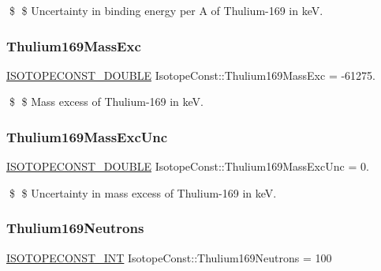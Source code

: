 \$ \$ Uncertainty in binding energy per A of Thulium-\/169 in keV. \mbox{\label{group___isotope_const-_thulium-_tm169_ga30a00fe6227c0a8cc344b796b36d9b06}} 
\subsubsection{\texorpdfstring{Thulium169\+Mass\+Exc}{Thulium169MassExc}}
{\footnotesize\ttfamily \mbox{\hyperlink{group___isotope_const-_macros_ga8f45a7272ce02c0b4c65c44636ed719a}{I\+S\+O\+T\+O\+P\+E\+C\+O\+N\+S\+T\+\_\+\+D\+O\+U\+B\+LE}} Isotope\+Const\+::\+Thulium169\+Mass\+Exc = -\/61275.}

\$ \$ Mass excess of Thulium-\/169 in keV. \mbox{\label{group___isotope_const-_thulium-_tm169_ga26493ef7ed56edf2b155352038d50f10}} 
\subsubsection{\texorpdfstring{Thulium169\+Mass\+Exc\+Unc}{Thulium169MassExcUnc}}
{\footnotesize\ttfamily \mbox{\hyperlink{group___isotope_const-_macros_ga8f45a7272ce02c0b4c65c44636ed719a}{I\+S\+O\+T\+O\+P\+E\+C\+O\+N\+S\+T\+\_\+\+D\+O\+U\+B\+LE}} Isotope\+Const\+::\+Thulium169\+Mass\+Exc\+Unc = 0.}

\$ \$ Uncertainty in mass excess of Thulium-\/169 in keV. \mbox{\label{group___isotope_const-_thulium-_tm169_ga09f2edf34cb06de3dc0963d533187904}} 
\subsubsection{\texorpdfstring{Thulium169\+Neutrons}{Thulium169Neutrons}}
{\footnotesize\ttfamily \mbox{\hyperlink{group___isotope_const-_macros_ga5f18360b3e99483a35c32d789e62621c}{I\+S\+O\+T\+O\+P\+E\+C\+O\+N\+S\+T\+\_\+\+I\+NT}} Isotope\+Const\+::\+Thulium169\+Neutrons = 100}

